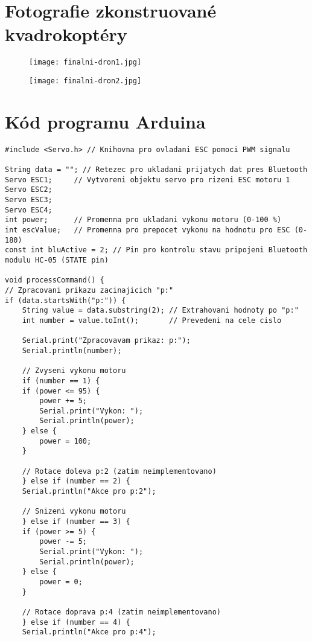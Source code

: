 \documentclass[12pt]{report}
\begin{document}
\begin{appendices}
\chapter{Fotografie zkonstruované kvadrokoptéry}	
\begin{figure}[H]
	\centering
	\texttt{[image: finalni-dron1.jpg]}
\end{figure}
\begin{figure}[H]
	\centering
	\texttt{[image: finalni-dron2.jpg]}
\end{figure}
\chapter{Kód programu Arduina}
\begin{lstlisting}[title={}, caption={}, label={}, basicstyle=\footnotesize\ttfamily, inputencoding=utf8]
#include <Servo.h> // Knihovna pro ovladani ESC pomoci PWM signalu

String data = ""; // Retezec pro ukladani prijatych dat pres Bluetooth
Servo ESC1;     // Vytvoreni objektu servo pro rizeni ESC motoru 1
Servo ESC2;
Servo ESC3;
Servo ESC4;
int power;      // Promenna pro ukladani vykonu motoru (0-100 %)
int escValue;   // Promenna pro prepocet vykonu na hodnotu pro ESC (0-180)
const int bluActive = 2; // Pin pro kontrolu stavu pripojeni Bluetooth modulu HC-05 (STATE pin)

void processCommand() {
// Zpracovani prikazu zacinajicich "p:"
if (data.startsWith("p:")) {
	String value = data.substring(2); // Extrahovani hodnoty po "p:"
	int number = value.toInt();       // Prevedeni na cele cislo

	Serial.print("Zpracovavam prikaz: p:");
	Serial.println(number);

	// Zvyseni vykonu motoru
	if (number == 1) {
	if (power <= 95) {
		power += 5;
		Serial.print("Vykon: ");
		Serial.println(power);
	} else {
		power = 100;
	}

	// Rotace doleva p:2 (zatim neimplementovano)
	} else if (number == 2) {
	Serial.println("Akce pro p:2");

	// Snizeni vykonu motoru
	} else if (number == 3) {
	if (power >= 5) {
		power -= 5;
		Serial.print("Vykon: ");
		Serial.println(power);
	} else {
		power = 0;
	}

	// Rotace doprava p:4 (zatim neimplementovano)
	} else if (number == 4) {
	Serial.println("Akce pro p:4");


\end{lstlisting}
\end{appendices}
\end{document}
